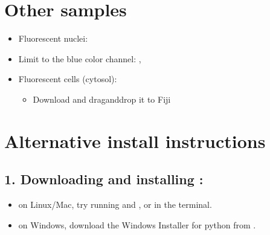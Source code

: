 \documentclass[letterpaper,10pt,english]{jupyterBook}
\begin{document}
\section{Other samples}
\label{\detokenize{cellpose:other-samples}}\begin{itemize}
\item {} 
\sphinxAtStartPar
Fluorescent nuclei: 

\item {} 
\sphinxAtStartPar
Limit to the blue color channel: ,

\item {} 
\sphinxAtStartPar
Fluorescent cells (cytosol):
\begin{itemize}
\item {} 
\sphinxAtStartPar
Download  and drag\sphinxhyphen{}and\sphinxhyphen{}drop it to Fiji

\end{itemize}

\end{itemize}


\section{Alternative install instructions}
\label{\detokenize{cellpose:alternative-install-instructions}}

\subsection{1. Downloading and installing :}
\label{\detokenize{cellpose:downloading-and-installing-python}}\begin{itemize}
\item {} 
\sphinxAtStartPar
on Linux/Mac, try running  and , or  in the terminal.

\item {} 
\sphinxAtStartPar
on Windows, download the Windows Installer for python from .

\end{itemize}
\end{document}
